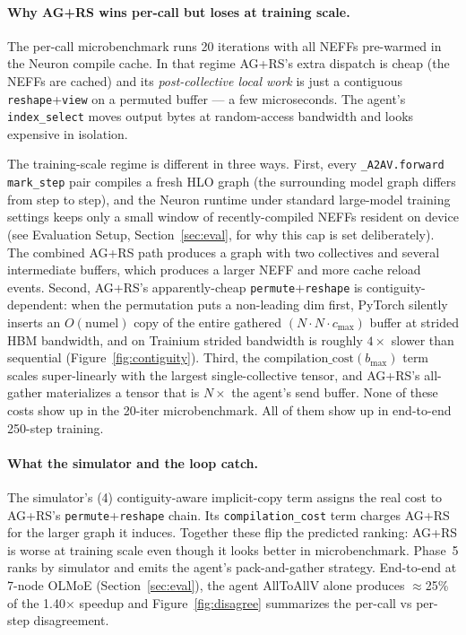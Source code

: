 \paragraph{Why AG+RS wins per-call but loses at training scale.}
The per-call microbenchmark runs 20 iterations with all NEFFs pre-warmed
in the Neuron compile cache. In that regime AG+RS's extra dispatch is
cheap (the NEFFs are cached) and its \emph{post-collective local
work} is just a contiguous \texttt{reshape}+\texttt{view} on a
permuted buffer --- a few microseconds. The agent's \texttt{index\_select}
moves output bytes at random-access bandwidth and looks expensive in
isolation.

The training-scale regime is different in three ways. First, every
\texttt{\_A2AV.forward} \texttt{mark\_step} pair compiles a fresh HLO
graph (the surrounding model graph differs from step to step), and
the Neuron runtime under standard large-model training settings
keeps only a small window of recently-compiled NEFFs resident on
device (see Evaluation Setup, Section~\ref{sec:eval}, for why this
cap is set deliberately). The combined AG+RS path produces a graph
with two collectives and several intermediate buffers, which
produces a larger NEFF and more cache reload events. Second, AG+RS's apparently-cheap
\texttt{permute}+\texttt{reshape} is contiguity-dependent: when the
permutation puts a non-leading dim first, PyTorch silently inserts an
$O(\text{numel})$ copy of the entire gathered $(N \cdot N \cdot
c_{\max})$ buffer at strided HBM bandwidth, and on Trainium strided
bandwidth is roughly $4\times$ slower than sequential
(Figure~\ref{fig:contiguity}). Third, the
$\text{compilation\_cost}(b_{\max})$ term scales super-linearly with
the largest single-collective tensor, and AG+RS's all-gather
materializes a tensor that is $N \times$ the agent's send buffer.
None of these costs show up in the 20-iter microbenchmark. All of
them show up in end-to-end 250-step training.

\paragraph{What the simulator and the loop catch.}
The simulator's (4) contiguity-aware implicit-copy term assigns the
real cost to AG+RS's \texttt{permute}+\texttt{reshape} chain. Its
\texttt{compilation\_cost} term charges AG+RS for the larger graph it
induces. Together these flip the predicted ranking: AG+RS is worse at
training scale even though it looks better in microbenchmark. Phase~5
ranks by simulator and emits the agent's pack-and-gather strategy.
End-to-end at 7-node OLMoE (Section~\ref{sec:eval}), the agent
AllToAllV alone produces $\approx$25\% of the 1.40$\times$ speedup
and Figure~\ref{fig:disagree} summarizes the per-call vs
per-step disagreement.

